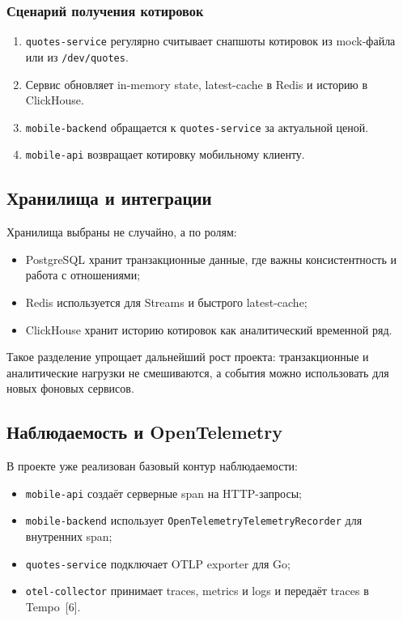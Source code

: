 \documentclass[12pt,a4paper]{article}
\begin{document}
\subsubsection{Сценарий получения котировок}

\begin{enumerate}[leftmargin=1.2cm]
    \item \texttt{quotes-service} регулярно считывает снапшоты котировок из mock-файла или из \texttt{/dev/quotes}.
    \item Сервис обновляет in-memory state, latest-cache в Redis и историю в ClickHouse.
    \item \texttt{mobile-backend} обращается к \texttt{quotes-service} за актуальной ценой.
    \item \texttt{mobile-api} возвращает котировку мобильному клиенту.
\end{enumerate}

\subsection{Хранилища и интеграции}

Хранилища выбраны не случайно, а по ролям:

\begin{itemize}[leftmargin=1.2cm]
    \item PostgreSQL хранит транзакционные данные, где важны консистентность и работа с отношениями;
    \item Redis используется для Streams и быстрого latest-cache;
    \item ClickHouse хранит историю котировок как аналитический временной ряд.
\end{itemize}

Такое разделение упрощает дальнейший рост проекта: транзакционные и аналитические нагрузки не смешиваются, а события можно использовать для новых фоновых сервисов.

\subsection{Наблюдаемость и OpenTelemetry}

В проекте уже реализован базовый контур наблюдаемости:

\begin{itemize}[leftmargin=1.2cm]
    \item \texttt{mobile-api} создаёт серверные span на HTTP-запросы;
    \item \texttt{mobile-backend} использует \texttt{OpenTelemetryTelemetryRecorder} для внутренних span;
    \item \texttt{quotes-service} подключает OTLP exporter для Go;
    \item \texttt{otel-collector} принимает traces, metrics и logs и передаёт traces в Tempo~[6].
\end{itemize}
\end{document}

